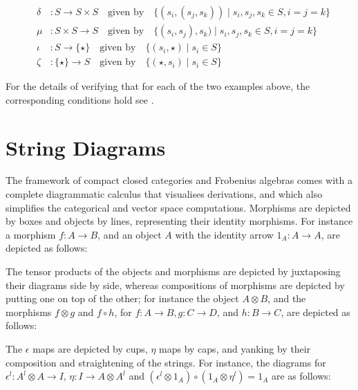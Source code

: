 \begin{eqnarray*}
&\delta &\colon   S \to S \times S \quad \mbox{given by} \quad
\{(s_i, (s_j, s_k)) \mid s_i, s_j, s_k \in S, i = j  = k\}\\
& \mu & \colon   S \times S \to S
\quad \mbox{given by} \quad 
\{(s_i, s_j), s_k) \mid s_i, s_j, s_k\in S, i = j=k\}\\
& \iota& \colon S \to  \{\star\}    \quad \mbox{given by} \quad \{(s_i, \star) \mid s_i \in S\}\\
&\zeta& \colon  \{\star\}  \to S  \quad \mbox{given by} \quad \{(\star, s_i) \mid s_i \in S\}
\end{eqnarray*}

For the details of verifying that for each of the two examples above,  the corresponding conditions hold see \cite{CoeckePaq}. 

\section{String Diagrams} 
\label{string}

The framework of compact closed categories and Frobenius algebras
comes with a complete diagrammatic calculus that visualises
derivations, and which also simplifies the
categorical and vector space computations. Morphisms are depicted by
boxes and objects by lines, representing their identity morphisms. For
instance a morphism $f \colon A \to B$, and an object $A$ with the
identity arrow $1_A \colon A \to A$, are depicted as follows:

\begin{center}
\end{center}

The tensor products of the objects and morphisms are depicted by
juxtaposing their diagrams side by side, whereas compositions of
morphisms are depicted by putting one on top of the other; for instance
the object $A \otimes B$, and the morphisms $f \otimes g$ and $f \circ
h$, for $f \colon A \to B, g \colon C \to D$, and $h \colon B \to C$,
are depicted as follows:

\begin{center}
\end{center}

The $\epsilon$ maps are depicted by cups, $\eta$ maps by caps, and
yanking by their composition and straightening of the strings.  For
instance, the diagrams for $\epsilon^l \colon A^l \otimes A \to I$,
$\eta \colon I \to A\otimes A^l$ and $(\epsilon^l \otimes 1_A) \circ
(1_A \otimes \eta^l) = 1_A$ are as follows:

